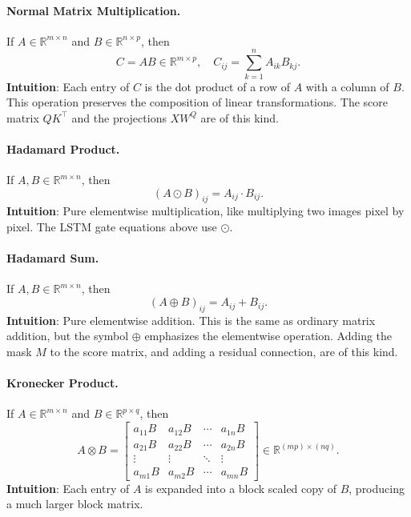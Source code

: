 \documentclass[11pt]{article}
\theoremstyle{remark}
\begin{document}
\paragraph{Normal Matrix Multiplication.}
If \(A \in \mathbb{R}^{m \times n}\) and \(B \in \mathbb{R}^{n \times p}\), then
\[
C = AB \in \mathbb{R}^{m \times p}, \quad
C_{ij} = \sum_{k=1}^n A_{ik} B_{kj}.
\]
\textbf{Intuition}: Each entry of \(C\) is the dot product of a row of \(A\) with a column of \(B\). This operation preserves the composition of linear transformations. The score matrix \(QK^\top\) and the projections \(XW^Q\) are of this kind.

\paragraph{Hadamard Product.}
If \(A, B \in \mathbb{R}^{m \times n}\), then
\[
(A \odot B)_{ij} = A_{ij} \cdot B_{ij}.
\]
\textbf{Intuition}: Pure elementwise multiplication, like multiplying two images pixel by pixel. The LSTM gate equations above use \(\odot\).

\paragraph{Hadamard Sum.}
If \(A, B \in \mathbb{R}^{m \times n}\), then
\[
(A \oplus B)_{ij} = A_{ij} + B_{ij}.
\]
\textbf{Intuition}: Pure elementwise addition. This is the same as ordinary matrix addition, but the symbol $\oplus$ emphasizes the elementwise operation. Adding the mask \(M\) to the score matrix, and adding a residual connection, are of this kind.

\paragraph{Kronecker Product.}
If \(A \in \mathbb{R}^{m \times n}\) and \(B \in \mathbb{R}^{p \times q}\), then
\[
A \otimes B =
\begin{bmatrix}
a_{11}B & a_{12}B & \cdots & a_{1n}B \\
a_{21}B & a_{22}B & \cdots & a_{2n}B \\
\vdots  & \vdots  & \ddots & \vdots  \\
a_{m1}B & a_{m2}B & \cdots & a_{mn}B
\end{bmatrix}
\in \mathbb{R}^{(mp) \times (nq)}.
\]
\textbf{Intuition}: Each entry of \(A\) is expanded into a block scaled copy of \(B\), producing a much larger block matrix.
\end{document}
